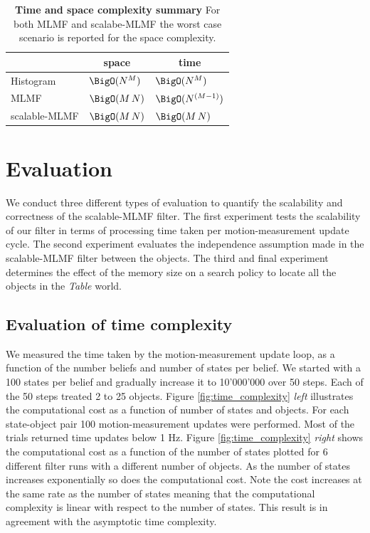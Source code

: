 \begin{table}
 \centering
 \begin{tabular}{c|c|c|}
\cline{2-3}
				        &    \textbf{space}   &     \textbf{time} \\ \hline
    \multicolumn{1}{|l}{Histogram}      & \multicolumn{1}{|l}{$\BigO(N^M)$}   &  \multicolumn{1}{|l|}{$\BigO(N^M)$}      \\ \hline
    \multicolumn{1}{|l}{MLMF}           & \multicolumn{1}{|l}{$\BigO(M\,N)$}  &  \multicolumn{1}{|l|}{$\BigO(N^{(M-1)})$} \\ \hline
    \multicolumn{1}{|l}{scalable-MLMF}  & \multicolumn{1}{|l}{$\BigO(M\,N)$}  &  \multicolumn{1}{|l|}{$\BigO(M\,N)$}     \\ \hline
   \end{tabular}
   \caption{\textbf{Time and space complexity summary} For both MLMF and scalabe-MLMF the worst case scenario is reported for the space complexity.}
   \label{tab:time_space_summary}
\end{table}



\section{Evaluation}\label{ch5:evaluation}

We conduct three different types of evaluation to quantify the scalability and correctness of the scalable-MLMF filter. The first experiment
tests the scalability of our filter in terms of processing time taken per motion-measurement update cycle. The second experiment evaluates the independence 
assumption made in the scalable-MLMF filter between the objects. The third and final experiment determines the effect of the 
memory size on a search policy to locate all the objects in the \textit{Table} world.

\subsection{Evaluation of time complexity}

We measured the time taken by the motion-measurement update loop, as a function of the number beliefs and number of states per belief. 
We started with a 100 states per belief and gradually increase it to 10'000'000 over 50 steps. Each of the 50 steps treated 2 to 25  objects. 
Figure \ref{fig:time_complexity} \textit{left} illustrates the computational
cost as a function of number of states and objects. For each state-object pair 100 motion-measurement updates were performed. Most of the trials returned time updates 
below 1 Hz. Figure \ref{fig:time_complexity} \textit{right} shows the computational cost as a function of the number of states plotted for 6 different filter runs with
a different number of objects. As the number of states increases exponentially so does the computational cost. Note the cost increases at the same
rate as the number of states meaning that the computational complexity is linear with respect to the number of states. This result is in agreement with 
the asymptotic time complexity.

